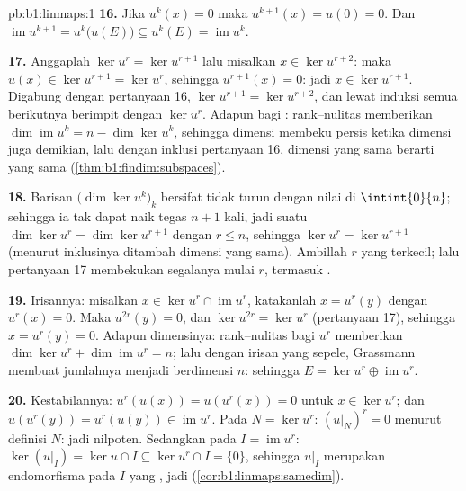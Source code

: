 \begin{solution}{pb:b1:linmaps:1}
\textbf{16.} Jika $u^k(x) = 0$ maka $u^{k+1}(x) = u(0) = 0$. Dan
$\operatorname{im} u^{k+1} = u^k\bigl(u(E)\bigr) \subseteq
u^k(E) = \operatorname{im} u^k$.

\textbf{17.} Anggaplah $\ker u^{r} = \ker u^{r+1}$ lalu misalkan $x \in
\ker u^{r+2}$: maka $u(x) \in \ker u^{r+1} = \ker u^{r}$, sehingga
$u^{r+1}(x) = 0$: jadi $x \in \ker u^{r+1}$. Digabung dengan pertanyaan 16,
$\ker u^{r+1} = \ker u^{r+2}$, dan lewat induksi semua
 berikutnya berimpit dengan $\ker u^{r}$. Adapun bagi : rank--nulitas
memberikan $\dim\operatorname{im} u^k = n - \dim\ker u^k$, sehingga
dimensi  membeku persis ketika dimensi  juga demikian,
lalu dengan inklusi pertanyaan 16, dimensi yang sama berarti
 yang sama (\cref{thm:b1:findim:subspaces}).

\textbf{18.} Barisan $\bigl(\dim\ker u^k\bigr)_k$ bersifat
tidak turun dengan nilai di $\intint{0}{n}$; sehingga ia tak dapat naik
tegas $n + 1$ kali, jadi suatu $\dim\ker u^{r} = \dim\ker
u^{r+1}$ dengan $r \leq n$, sehingga $\ker u^{r} = \ker u^{r+1}$
(menurut inklusinya ditambah dimensi yang sama). Ambillah $r$ yang terkecil; lalu pertanyaan 17
membekukan segalanya mulai $r$, termasuk .

\textbf{19.} Irisannya: misalkan $x \in \ker u^{r} \cap
\operatorname{im} u^{r}$, katakanlah $x = u^{r}(y)$ dengan $u^{r}(x) =
0$. Maka $u^{2r}(y) = 0$, dan $\ker u^{2r} = \ker u^{r}$
(pertanyaan 17), sehingga $x = u^{r}(y) = 0$. Adapun dimensinya: rank--nulitas
bagi $u^{r}$ memberikan $\dim\ker u^{r} + \dim\operatorname{im} u^{r}
= n$; lalu dengan irisan yang sepele, Grassmann membuat jumlahnya menjadi
 berdimensi $n$: sehingga $E = \ker u^{r} \oplus
\operatorname{im} u^{r}$.

\textbf{20.} Kestabilannya: $u^{r}(u(x)) = u(u^{r}(x)) = 0$ untuk $x
\in \ker u^{r}$; dan $u(u^{r}(y)) = u^{r}(u(y)) \in
\operatorname{im} u^{r}$. Pada $N = \ker u^{r}$: $(u|_N)^{r} = 0$
menurut definisi $N$: jadi nilpoten. Sedangkan pada $I = \operatorname{im}
u^{r}$: $\ker(u|_I) = \ker u \cap I \subseteq \ker u^{r} \cap I
= \{0\}$, sehingga $u|_I$ merupakan endomorfisma  pada
$I$ yang , jadi 
(\cref{cor:b1:linmaps:samedim}).


\end{solution}
